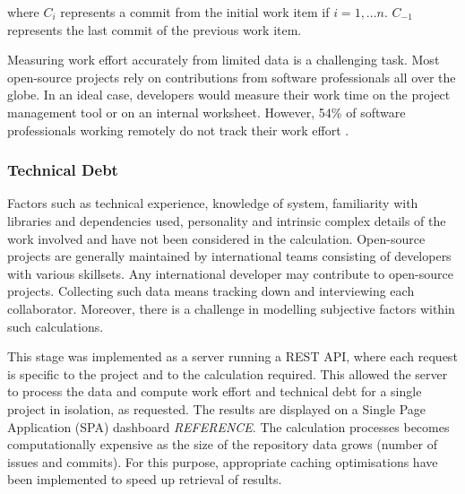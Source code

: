 \documentclass{mpaper}
\begin{document}
where $C_{i}$ represents a commit from the initial work item if $i = 1,...n$.
$C_{-1}$ represents the last commit of the previous work item.

Measuring work effort accurately from limited data is a challenging task. Most
open-source projects rely on contributions from software professionals all over
the globe. In an ideal case, developers would measure their work time on the
project management tool or on an internal worksheet. However, 54\% of software
professionals working remotely do not track their work effort
\cite{DeveloperSurvey2018}.

\subsubsection*{Technical Debt}



Factors such as technical experience, knowledge of system, familiarity with
libraries and dependencies used, personality and intrinsic complex details of
the work involved and have not been considered in the calculation. Open-source
projects are generally maintained by international teams consisting of
developers with various skillsets. Any international developer may contribute to
open-source projects. Collecting such data means tracking down and interviewing
each collaborator. Moreover, there is a challenge in modelling subjective
factors within such calculations.

This stage was implemented as a server running a REST API, where each request is
specific to the project and to the calculation required. This allowed the server
to process the data and compute work effort and technical debt for a single
project in isolation, as requested. The results are displayed on a Single Page
Application (SPA) dashboard \emph{REFERENCE}. The calculation processes becomes
computationally expensive as the size of the repository data grows (number of
issues and commits). For this purpose, appropriate caching optimisations have
been implemented to speed up retrieval of results.

\end{document}
